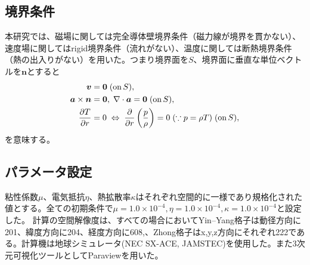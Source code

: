 \documentclass[12pt]{jsarticle}
\begin{document}


\subsection{境界条件}
本研究では、磁場に関しては完全導体壁境界条件（磁力線が境界を貫かない）、速度場に関してはrigid境界条件（流れがない）、温度に関しては断熱境界条件（熱の出入りがない）を用いた。つまり境界面を$S$、境界面に垂直な単位ベクトルを$\bm n$とすると
\begin{align}
\bm{v} &= \bm{0} \; ({\rm on}\, S), \\
\bm{a} \times \bm{n} &= \bm{0} , \; \nabla \cdot \bm{a} = \bm{0} \; ({\rm on}\, S), \\
\frac{\partial T}{\partial r} &= 0 \; \Leftrightarrow \; \frac{\partial}{\partial r}\left(\frac{p}{\rho}\right) = 0 \; (\because p=\rho T) \; ({\rm on}\, S),  
\end{align}
を意味する。

\subsection{パラメータ設定}
粘性係数$\mu$、電気抵抗$\eta$、熱拡散率$\kappa$はそれぞれ空間的に一様であり規格化された値とする。全ての初期条件で$\mu=1.0\times10^{-4},\eta=1.0\times10^{-4},\kappa=1.0\times10^{-4}$と設定した。
計算の空間解像度は、すべての場合においてYin--Yang格子は動径方向に201、緯度方向に204、経度方向に608,、Zhong格子はx,y,z方向にそれぞれ222である。計算機は地球シミュレータ(NEC SX-ACE, JAMSTEC)を使用した。また3次元可視化ツールとしてParaviewを用いた。
\end{document}
